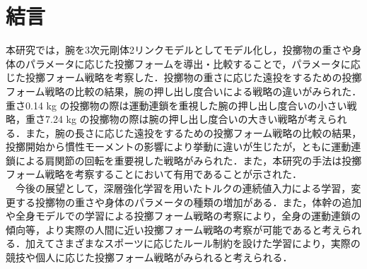 \section{結言}
本研究では，腕を3次元剛体2リンクモデルとしてモデル化し，投擲物の重さや身体のパラメータに応じた投擲フォームを導出・比較することで，パラメータに応じた投擲フォーム戦略を考察した．投擲物の重さに応じた遠投をするための投擲フォーム戦略の比較の結果，腕の押し出し度合いによる戦略の違いがみられた．重さ0.14 kg の投擲物の際は運動連鎖を重視した腕の押し出し度合いの小さい戦略，重さ7.24 kg の投擲物の際は腕の押し出し度合いの大きい戦略が考えられる．また，腕の長さに応じた遠投をするための投擲フォーム戦略の比較の結果，投擲開始から慣性モーメントの影響により挙動に違いが生じたが，ともに運動連鎖による肩関節の回転を重要視した戦略がみられた．また，本研究の手法は投擲フォーム戦略を考察することにおいて有用であることが示された．\\
　今後の展望として，深層強化学習を用いたトルクの連続値入力による学習，変更する投擲物の重さや身体のパラメータの種類の増加がある．また，体幹の追加や全身モデルでの学習による投擲フォーム戦略の考察により，全身の運動連鎖の傾向等，より実際の人間に近い投擲フォーム戦略の考察が可能であると考えられる．加えてさまざまなスポーツに応じたルール制約を設けた学習により，実際の競技や個人に応じた投擲フォーム戦略がみられると考えられる．






